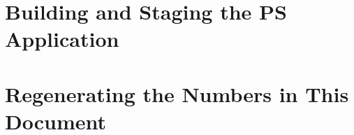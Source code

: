 \section{Building and Staging the PS Application}
\label{sec:repro-ps}

\section{Regenerating the Numbers in This Document}
\label{sec:repro-numbers}
